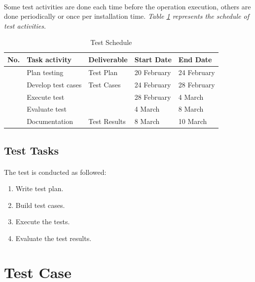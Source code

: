 \documentclass[12pt, oneside, a4paper]{book}
\newcounter{magicrownumbers}
\newcommand\rownumber{\stepcounter{magicrownumbers}\arabic{magicrownumbers}}
\newcommand\boldcolor[1]{\textcolor{bold}{\textbf{#1}}}
\begin{document}
			\paragraph{}Some test activities are done each time before the operation execution, others are done periodically or once per installation time. \textit{Table \ref{table:test_schedule} represents the schedule of test activities.}
			\def\arraystretch{1.5}
			\begin{table}[H]
				\begin{center}
					\begin{tabularx}{\linewidth}{|c|X|X|X|X|}\hline
						\boldcolor{No.} & \boldcolor{Task activity} & \boldcolor{Deliverable} & \boldcolor{Start Date} & \boldcolor{End Date}\\\hline
						\rownumber & Plan testing & Test Plan & 20 February & 24 February \\\hline
						\rownumber & Develop test cases & Test Cases & 24 February & 28 February \\\hline
						\rownumber & Execute test & & 28 February & 4 March \\\hline
						\rownumber & Evaluate test & & 4 March & 8 March \\\hline
						\rownumber & Documentation & Test Results & 8 March & 10 March \\\hline
					\end{tabularx}
				\end{center}
				\caption{Test Schedule}
				\label{table:test_schedule}
			\end{table}

			\subsection{Test Tasks}
			\paragraph{}The test is conducted as followed:
			\begin{enumerate}
				\item Write test plan.
				\item Build test cases.
				\item Execute the tests.
				\item Evaluate the test results.
			\end{enumerate}
		\section{Test Case}
\end{document}
